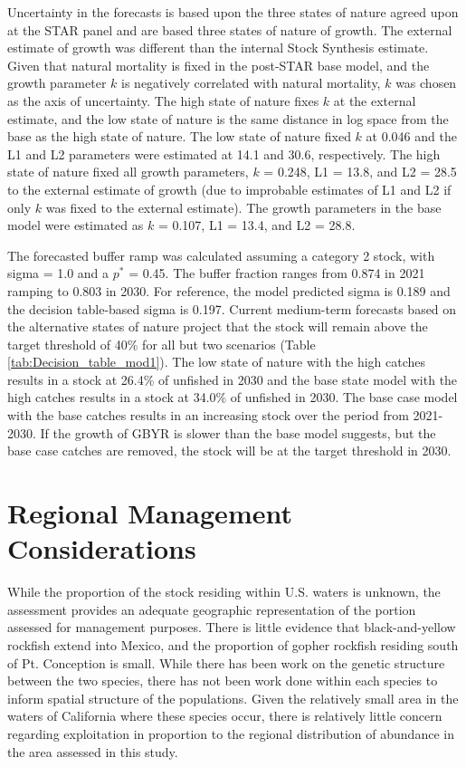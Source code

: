 \documentclass[12pt,]{article}
\begin{document}
Uncertainty in the forecasts is based upon the three states of nature
agreed upon at the STAR panel and are based three states of nature of
growth. The external estimate of growth was different than the internal
Stock Synthesis estimate. Given that natural mortality is fixed in the
post-STAR base model, and the growth parameter \(k\) is negatively
correlated with natural mortality, \(k\) was chosen as the axis of
uncertainty. The high state of nature fixes \(k\) at the external
estimate, and the low state of nature is the same distance in log space
from the base as the high state of nature. The low state of nature fixed
\(k\) at 0.046 and the L1 and L2 parameters were estimated at 14.1 and
30.6, respectively. The high state of nature fixed all growth
parameters, \(k\) = 0.248, L1 = 13.8, and L2 = 28.5 to the external
estimate of growth (due to improbable estimates of L1 and L2 if only
\(k\) was fixed to the external estimate). The growth parameters in the
base model were estimated as \(k\) = 0.107, L1 = 13.4, and L2 = 28.8.

The forecasted buffer ramp was calculated assuming a category 2 stock,
with sigma = 1.0 and a \(p^*\) = 0.45. The buffer fraction ranges from
0.874 in 2021 ramping to 0.803 in 2030. For reference, the model
predicted sigma is 0.189 and the decision table-based sigma is 0.197.
Current medium-term forecasts based on the alternative states of nature
project that the stock will remain above the target threshold of 40\%
for all but two scenarios (Table \ref{tab:Decision_table_mod1}). The low
state of nature with the high catches results in a stock at 26.4\% of
unfished in 2030 and the base state model with the high catches results
in a stock at 34.0\% of unfished in 2030. The base case model with the
base catches results in an increasing stock over the period from
2021-2030. If the growth of GBYR is slower than the base model suggests,
but the base case catches are removed, the stock will be at the target
threshold in 2030.

\section{Regional Management
Considerations}\label{regional-management-considerations}

While the proportion of the stock residing within U.S. waters is
unknown, the assessment provides an adequate geographic representation
of the portion assessed for management purposes. There is little
evidence that black-and-yellow rockfish extend into Mexico, and the
proportion of gopher rockfish residing south of Pt. Conception is small.
While there has been work on the genetic structure between the two
species, there has not been work done within each species to inform
spatial structure of the populations. Given the relatively small area in
the waters of California where these species occur, there is relatively
little concern regarding exploitation in proportion to the regional
distribution of abundance in the area assessed in this study.
\end{document}
